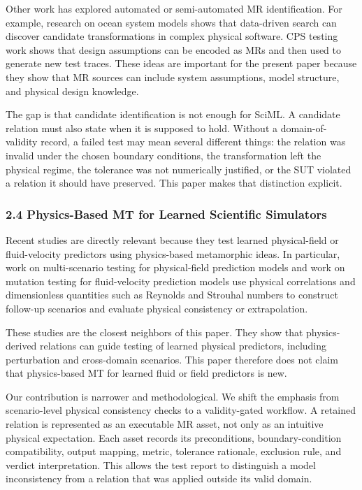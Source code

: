 Other work has explored automated or semi-automated MR identification.
For example, research on ocean system models shows that data-driven
search can discover candidate transformations in complex physical
software. CPS testing work shows that design assumptions can be encoded
as MRs and then used to generate new test traces. These ideas are
important for the present paper because they show that MR sources can
include system assumptions, model structure, and physical design
knowledge.

The gap is that candidate identification is not enough for SciML. A
candidate relation must also state when it is supposed to hold. Without
a domain-of-validity record, a failed test may mean several different
things: the relation was invalid under the chosen boundary conditions,
the transformation left the physical regime, the tolerance was not
numerically justified, or the SUT violated a relation it should have
preserved. This paper makes that distinction explicit.

\subsubsection{2.4 Physics-Based MT for Learned Scientific
Simulators}\label{physics-based-mt-for-learned-scientific-simulators}

Recent studies are directly relevant because they test learned
physical-field or fluid-velocity predictors using physics-based
metamorphic ideas. In particular, work on multi-scenario testing for
physical-field prediction models and work on mutation testing for
fluid-velocity prediction models use physical correlations and
dimensionless quantities such as Reynolds and Strouhal numbers to
construct follow-up scenarios and evaluate physical consistency or
extrapolation.

These studies are the closest neighbors of this paper. They show that
physics-derived relations can guide testing of learned physical
predictors, including perturbation and cross-domain scenarios. This
paper therefore does not claim that physics-based MT for learned fluid
or field predictors is new.

Our contribution is narrower and methodological. We shift the emphasis
from scenario-level physical consistency checks to a validity-gated
workflow. A retained relation is represented as an executable MR asset,
not only as an intuitive physical expectation. Each asset records its
preconditions, boundary-condition compatibility, output mapping, metric,
tolerance rationale, exclusion rule, and verdict interpretation. This
allows the test report to distinguish a model inconsistency from a
relation that was applied outside its valid domain.

